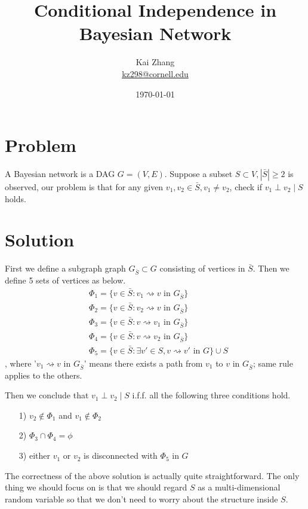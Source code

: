 \documentclass[12pt]{article}
\title{Conditional Independence in Bayesian Network}
\author{Kai Zhang \\
\href{mailto:kz298@cornell.edu}{kz298@cornell.edu}
}
\date{\today}                                           %
\begin{document}
\maketitle

\section*{Problem}
A Bayesian network is a DAG $G=(V, E)$. Suppose a subset $S\subset V, |\bar{S}|\geq 2$ is observed, our problem is that  for any given $v_1,v_2\in \bar{S},v_1\neq v_2$, check if $v_1\perp v_2\mid S$ holds.

\section*{Solution}
First we define a subgraph graph $G_{\bar{S}}\subset G$ consisting of vertices in $\bar{S}$. Then we define 5 sets of vertices as below.
\begin{align*}
&\Phi_1=\big\{v\in \bar{S}: v_1\rightsquigarrow v\text{ in } G_{\bar{S}}\big\}\\
&\Phi_2=\big\{v\in \bar{S}: v_2\rightsquigarrow v\text{ in } G_{\bar{S}}\big\} \\
&\Phi_3=\big\{v\in \bar{S}: v\rightsquigarrow v_1\text{ in } G_{\bar{S}}\big\}\\
&\Phi_4=\big\{v\in \bar{S}: v\rightsquigarrow v_2\text{ in } G_{\bar{S}}\big\}\\
&\Phi_5=\big\{v\in \bar{S}: \exists v'\in S, v\rightsquigarrow v'\text{ in } G\big\}\cup S
\end{align*}
, where '$v_1\rightsquigarrow v \text{ in } G_{\bar{S}}$' means there exists a path from $v_1$ to $v$ in $G_{\bar{S}}$; same rule applies to the others.

Then we conclude that $v_1\perp v_2\mid S$  i.f.f. all the following three conditions hold.
\begin{itemize}
\item[1)] $v_2\notin \Phi_1 $ and $v_1\notin \Phi_2$
\item[2)] $\Phi_3\cap \Phi_4=\phi$
\item[3)] either $v_1$ or $v_2$ is disconnected with $\Phi_5$ in $G$
\end{itemize}

The correctness of the above solution is actually quite straightforward. The only thing we should focus on is that we should regard $S$ as a multi-dimensional random variable so that we don't need to worry about the structure inside $S$.
\end{document}
